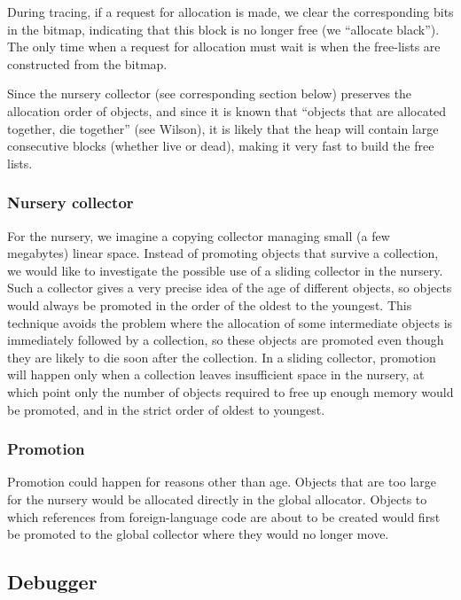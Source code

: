 \documentclass{article}
\begin{document}
During tracing, if a request for allocation is made, we clear the
corresponding bits in the bitmap, indicating that this block is no
longer free (we ``allocate black'').  The only time when a request for
allocation must wait is when the free-lists are constructed from the
bitmap. 

Since the nursery collector (see corresponding section below) preserves
the allocation order of objects, and since it is known that ``objects
that are allocated together, die together'' (see Wilson), it is likely
that the heap will contain large consecutive blocks (whether live or
dead), making it very fast to build the free lists. 

\subsubsection{Nursery collector}
For the nursery, we imagine a copying collector managing small (a few
megabytes) linear space.  Instead of promoting objects that survive a
collection, we would like to investigate the possible use of a sliding
collector in the nursery.  Such a collector gives a very precise idea
of the age of different objects, so objects would always be promoted
in the order of the oldest to the youngest.  This technique avoids the
problem where the allocation of some intermediate objects is
immediately followed by a collection, so these objects are promoted
even though they are likely to die soon after the collection.  In a
sliding collector, promotion will happen only when a collection leaves
insufficient space in the nursery, at which point only the number of
objects required to free up enough memory would be promoted, and in
the strict order of oldest to youngest. 

\subsubsection{Promotion}

Promotion could happen for reasons other than age.  Objects that are
too large for the nursery would be allocated directly in the global
allocator.  Objects to which references from foreign-language code are
about to be created would first be promoted to the global collector
where they would no longer move.

\subsection{Debugger}
\label{section-debugging}
\end{document}
